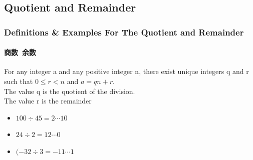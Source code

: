 \documentclass[
	11pt, %
	handout,
]{beamer}
\begin{document}


\subsection{Quotient and Remainder}

\begin{frame}
	\frametitle{Definitions \& Examples For The Quotient and Remainder}
	\framesubtitle{商数\ 余数}
	
	\begin{definition}
	For any integer a and any \alert{positive} integer n, there exist unique integers q and r such that \alert{$0\leq r < n$} and $a = qn + r$. \\
	The value q is the quotient of the division. \\ The value r is the remainder
	\end{definition}
	
	\smallskip %
	
	\begin{example}
		\begin{itemize}
			\item $100 \div 45 = 2 \cdots 10 $
			\item $24 \div 2 = 12 \cdots 0 $ 
			\item $ (-32 \div 3 = -11 \cdots 1 $ 
		\end{itemize}
	\end{example}
\end{frame}

\end{document}
